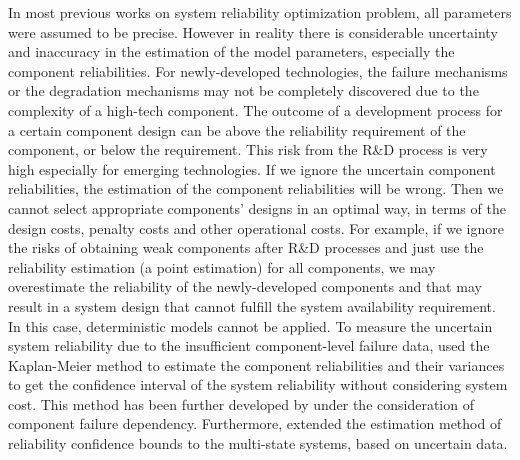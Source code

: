 \documentclass[preprint,12pt]{elsarticle}
\begin{document}
In most previous works on system reliability optimization problem, all parameters were assumed to be precise. However in reality there is considerable uncertainty and inaccuracy in the estimation of the model parameters, especially the component reliabilities. For newly-developed technologies, the failure mechanisms or the degradation mechanisms may not be completely discovered due to the complexity of a high-tech component. The outcome of a development process for a certain component design can be above the reliability requirement of the component, or below the requirement. This risk from the R\&D process is very high especially for emerging technologies. If we ignore the uncertain component reliabilities, the estimation of the component reliabilities will be wrong. Then we cannot select appropriate components’ designs in an optimal way, in terms of the design costs, penalty costs and other operational costs. For example, if we ignore the risks of obtaining weak components after R\&D processes and just use the reliability estimation (a point estimation) for all components, we may overestimate the reliability of the newly-developed components and that may result in a system design that cannot fulfill the system availability requirement. In this case, deterministic models cannot be applied. To measure the uncertain system reliability due to the insufficient component-level failure data, \citet{Coit1997} used the Kaplan-Meier method to estimate the component reliabilities and their variances to get the confidence interval of the system reliability without considering system cost. This method has been further developed by \citet{Jinandcoit} under the consideration of component failure dependency. Furthermore, \citet{Ramirez-Marquez2008} extended the estimation method of reliability confidence bounds to the multi-state systems, based on uncertain data.
\end{document}
